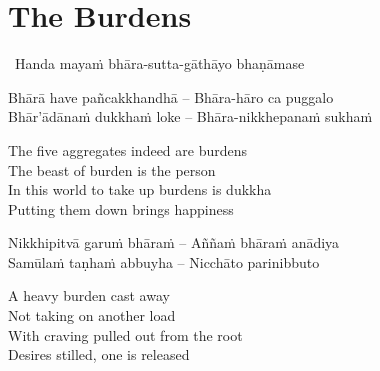\suttaRef{[Dhp 85-87.5]}


\section{The Burdens}
\label{burdens}

\begin{leader}
  \anglebracketleft\ \hspace{-0.5mm}Handa mayaṁ bhāra-sutta-gāthāyo bhaṇāmase \hspace{-0.5mm}\anglebracketright\
\end{leader}

\begin{verses}
  Bhārā have pañcakkhandhā – Bhāra-hāro ca puggalo\\
  Bhār'ādānaṁ dukkhaṁ loke – Bhāra-nikkhepanaṁ sukhaṁ
\end{verses}

\begin{english-verses}
  The five aggregates indeed are burdens\\
  The beast of burden is the person\makeatletter\hyperlink{endnote39-appendix}\makeatother\\
  In this world to take up burdens is dukkha\\
  Putting them down brings happiness
\end{english-verses}

\begin{verses}
  Nikkhipitvā garuṁ bhāraṁ – Aññaṁ bhāraṁ anādiya\\
  Samūlaṁ taṇhaṁ abbuyha – Nicchāto parinibbuto
\end{verses}

\begin{english-verses}
  A heavy burden cast away\\
  Not taking on another load\\
  With craving pulled out from the root\\
  Desires stilled, one is released
\end{english-verses}

